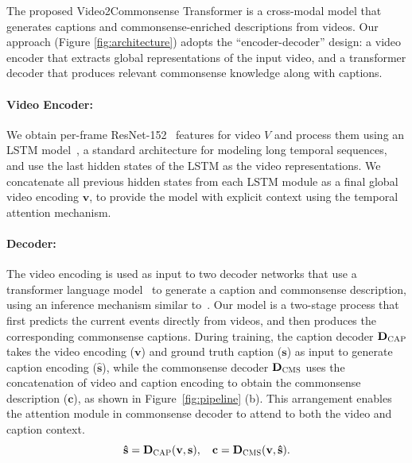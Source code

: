     The proposed Video2Commonsense Transformer is a cross-modal model that generates captions and commonsense-enriched descriptions from videos. 
    Our approach (Figure \ref{fig:architecture}) adopts the ``encoder-decoder'' design: a video encoder that extracts global representations of the input video, and a transformer decoder that produces relevant commonsense knowledge along with captions.
    
    \paragraph{Video Encoder:}
    We obtain per-frame ResNet-152~\cite{he2016deep} features for video $\mathit{V}$ and process them using an LSTM model~\cite{sundermeyer2012lstm}, a standard architecture for modeling long temporal sequences, and use the last hidden states of the LSTM as the video representations.
    We concatenate all previous hidden states from each LSTM module as a final global video encoding $\mathbf{v}$, to provide the model with explicit context using the temporal attention mechanism.
    
    \paragraph{Decoder:}
    The video encoding is used as input to two decoder networks that use a transformer language model~\cite{radford2018improving} to generate a caption and commonsense description, using an inference mechanism similar to~\citet{bosselut2019comet}.
    Our model is a two-stage process that first predicts the current events directly from videos, and then produces the corresponding commonsense captions. 
    During training, the caption decoder $\mathbf{D}_{\textsc{CAP}}$ takes the video encoding ($\mathbf{v}$) and ground truth caption ($\mathbf{s}$) as input to generate caption encoding ($\mathbf{\hat{s}}$), while the commonsense decoder $\mathbf{D}_{\textsc{CMS}}$ uses the concatenation of video and caption encoding to obtain the commonsense description ($\mathbf{c}$), as shown in Figure~\ref{fig:pipeline} (b).
    This arrangement enables the attention module in commonsense decoder to attend to both the video and caption context. 
    \begin{equation}
    \small
        \mathbf{\hat{s}} = \mathbf{D}_{\textsc{CAP}}(\mathbf{v},  \mathbf{s}),  \quad 
        \mathbf{c} = \mathbf{D}_{\textsc{CMS}}(\mathbf{v},  \mathbf{\hat{s}}).
    \end{equation}

